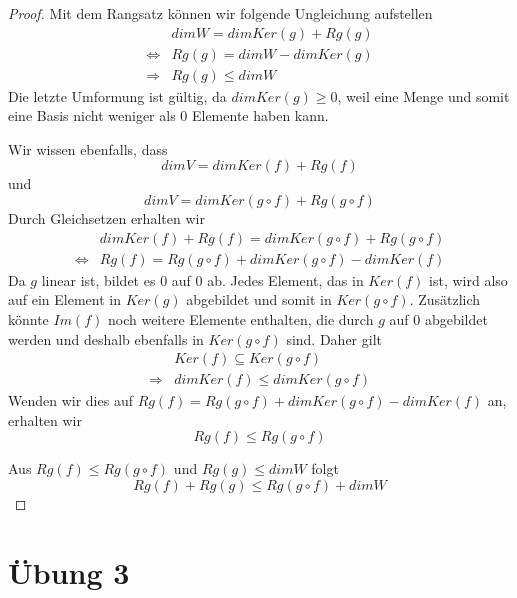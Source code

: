 \documentclass[a4paper,10pt]{article}
\begin{document}
\begin{proof}
 Mit dem Rangsatz können wir folgende Ungleichung aufstellen
 \begin{align*}
  & dim W = dim Ker(g) + Rg(g)\\
  \Leftrightarrow & Rg(g) = dim W - dim Ker(g)\\
  \Rightarrow & Rg(g) \le dim W
 \end{align*}
 Die letzte Umformung ist gültig, da $dim Ker(g) \ge 0$, weil eine Menge und somit eine Basis nicht weniger als $0$ Elemente haben kann.
 
 Wir wissen ebenfalls, dass
 \begin{equation}
  dim V = dim Ker(f) + Rg(f)
 \end{equation}
 und
 \begin{equation}
  dim V = dim Ker(g \circ f) + Rg(g \circ f)
 \end{equation}
 Durch Gleichsetzen erhalten wir
 \begin{align*}
  & dim Ker(f) + Rg(f) = dim Ker(g \circ f) + Rg(g \circ f)\\
  \Leftrightarrow & Rg(f) = Rg(g \circ f) + dim Ker(g \circ f) - dim Ker(f)
 \end{align*}
 Da $g$ linear ist, bildet es $0$ auf $0$ ab.
 Jedes Element, das in $Ker(f)$ ist, wird also auf ein Element in $Ker(g)$ abgebildet und somit in $Ker(g \circ f)$.
 Zusätzlich könnte $Im(f)$ noch weitere Elemente enthalten, die durch $g$ auf $0$ abgebildet werden und deshalb ebenfalls in $Ker(g \circ f)$ sind.
 Daher gilt
 \begin{align}
  & Ker(f) \subseteq Ker(g \circ f)\\
  \Rightarrow & dim Ker(f) \le dim Ker(g \circ f)
 \end{align}
 Wenden wir dies auf $Rg(f) = Rg(g \circ f) + dim Ker(g \circ f) - dim Ker(f)$ an, erhalten wir
 \begin{equation}
  Rg(f) \le Rg(g \circ f)
 \end{equation}

 Aus $Rg(f) \le Rg(g \circ f)$ und $Rg(g) \le dim W$ folgt
 \begin{equation}
  Rg(f) + Rg(g) \le Rg(g \circ f) + dim W
 \end{equation}
\end{proof}

\section*{Übung 3}
\end{document}
